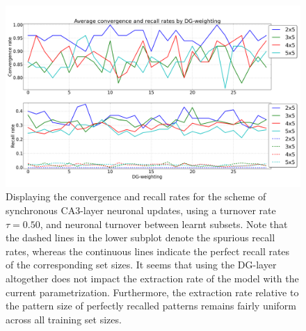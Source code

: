 \begin{figure}
    \centering
    \includegraphics[width=13cm]{fig/DGWs/sync_tm0_50}
    \caption{Displaying the convergence and recall rates for the scheme of synchronous CA3-layer neuronal updates, using a turnover rate $\tau=0.50$, and neuronal turnover between learnt subsets. Note that the dashed lines in the lower subplot denote the spurious recall rates, whereas the continuous lines indicate the perfect recall rates of the corresponding set sizes. It seems that using the DG-layer altogether does not impact the extraction rate of the model with the current parametrization. Furthermore, the extraction rate relative to the pattern size of perfectly recalled patterns remains fairly uniform across all training set sizes.}
    \label{fig:sync_tm0_50}
\end{figure}



